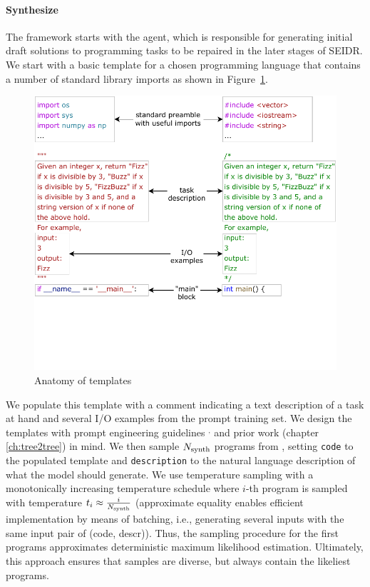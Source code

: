 \paragraph{Synthesize}
\label{sec:seidr-synth}


The framework starts with the \synthesize{} agent, which is responsible for generating initial draft solutions to programming tasks to be repaired in the later stages of SEIDR.
We start with a basic template for a chosen programming language that contains a number of standard library imports as shown in Figure~\ref{fig:template}.

\begin{figure}[H]
    \centering
    \includegraphics[width=0.8\linewidth, trim={0mm 40mm 0mm 0mm}, clip]{images/Templates-new-v2.pdf}
    \caption{Anatomy of \synthesize{} templates}
    \label{fig:template}
\end{figure}

We populate this template with a comment indicating a text description of a task at hand and several I/O examples from the prompt training set.
We design the templates with prompt engineering guidelines \cite{PromptEngineering}$^{,}$ and prior work (chapter \ref{ch:tree2tree}) in mind.
We then sample $N_\text{synth}{}$ programs from \synthmodel{}, setting \texttt{code} to the populated template and \texttt{description} to the natural language description of what the model should generate.
We use temperature sampling with a monotonically increasing temperature schedule where $i$-th program is sampled with temperature $t_i \approx \frac{i}{N_\text{synth}{}}$ (approximate equality enables efficient implementation by means of batching, i.e., generating several inputs with the same input pair of (code, descr)).
Thus, the sampling procedure for the first programs approximates deterministic maximum likelihood estimation.
Ultimately, this approach ensures that samples are diverse, but always contain the likeliest programs.

